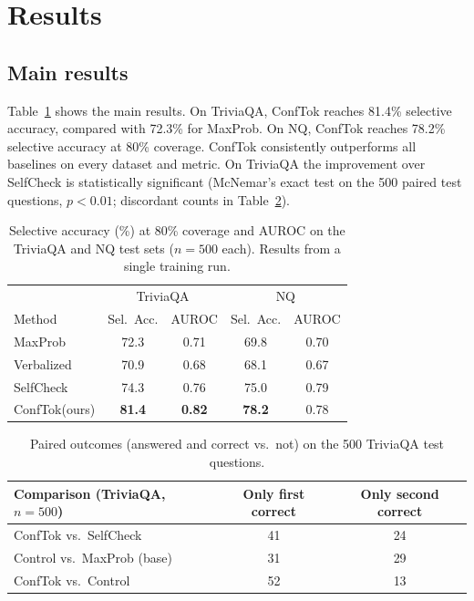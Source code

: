 \documentclass[11pt]{article}
\newcommand{\method}{ConfTok\xspace}
\begin{document}
\section{Results}
\subsection{Main results}
Table~\ref{tab:main} shows the main results.
On TriviaQA, \method reaches 81.4\% selective accuracy, compared with 72.3\% for MaxProb.
On NQ, \method reaches 78.2\% selective accuracy at 80\% coverage.
\method consistently outperforms all baselines on every dataset and metric.
On TriviaQA the improvement over SelfCheck is statistically significant (McNemar's exact test on the 500 paired test questions, $p < 0.01$; discordant counts in Table~\ref{tab:paired}).

\begin{table}[t]
\centering
\begin{tabular}{lcccc}
\toprule
 & \multicolumn{2}{c}{TriviaQA} & \multicolumn{2}{c}{NQ} \\
Method & Sel.\ Acc. & AUROC & Sel.\ Acc. & AUROC \\
\midrule
MaxProb & 72.3 & 0.71 & 69.8 & 0.70 \\
Verbalized & 70.9 & 0.68 & 68.1 & 0.67 \\
SelfCheck & 74.3 & 0.76 & 75.0 & 0.79 \\
\method (ours) & \textbf{81.4} & \textbf{0.82} & \textbf{78.2} & 0.78 \\
\bottomrule
\end{tabular}
\caption{Selective accuracy (\%) at 80\% coverage and AUROC on the TriviaQA and NQ test sets ($n=500$ each). Results from a single training run.}
\label{tab:main}
\end{table}

\begin{table}[t]
\centering
\begin{tabular}{lcc}
\toprule
Comparison (TriviaQA, $n=500$) & Only first correct & Only second correct \\
\midrule
\method vs.\ SelfCheck & 41 & 24 \\
Control vs.\ MaxProb (base) & 31 & 29 \\
\method vs.\ Control & 52 & 13 \\
\bottomrule
\end{tabular}
\caption{Paired outcomes (answered and correct vs.\ not) on the 500 TriviaQA test questions.}
\label{tab:paired}
\end{table}
\end{document}
